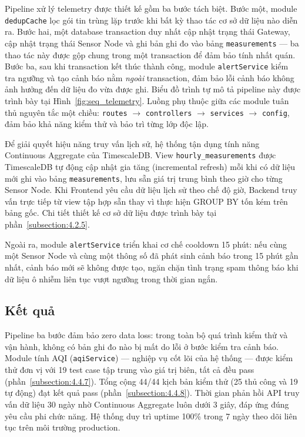 \documentclass[../DoAn.tex]{subfiles}
\begin{document}
Pipeline xử lý telemetry được thiết kế gồm ba bước tách biệt. Bước một, module \texttt{dedupCache} lọc gói tin trùng lặp trước khi bất kỳ thao tác cơ sở dữ liệu nào diễn ra. Bước hai, một database transaction duy nhất cập nhật trạng thái Gateway, cập nhật trạng thái Sensor Node và ghi bản ghi đo vào bảng \texttt{measurements} — ba thao tác này được gộp chung trong một transaction để đảm bảo tính nhất quán. Bước ba, sau khi transaction kết thúc thành công, module \texttt{alertService} kiểm tra ngưỡng và tạo cảnh báo nằm \textit{ngoài} transaction, đảm bảo lỗi cảnh báo không ảnh hưởng đến dữ liệu đo vừa được ghi. Biểu đồ trình tự mô tả pipeline này được trình bày tại Hình~\ref{fig:seq_telemetry}. Luồng phụ thuộc giữa các module tuân thủ nguyên tắc một chiều: \texttt{routes} $\rightarrow$ \texttt{controllers} $\rightarrow$ \texttt{services} $\rightarrow$ \texttt{config}, đảm bảo khả năng kiểm thử và bảo trì từng lớp độc lập.

Để giải quyết hiệu năng truy vấn lịch sử, hệ thống tận dụng tính năng Continuous Aggregate của TimescaleDB. View \texttt{hourly\_measurements} được TimescaleDB tự động cập nhật gia tăng (incremental refresh) mỗi khi có dữ liệu mới ghi vào bảng \texttt{measurements}, lưu sẵn giá trị trung bình theo giờ cho từng Sensor Node. Khi Frontend yêu cầu dữ liệu lịch sử theo chế độ giờ, Backend truy vấn trực tiếp từ view tập hợp sẵn thay vì thực hiện GROUP BY tốn kém trên bảng gốc. Chi tiết thiết kế cơ sở dữ liệu được trình bày tại phần~\ref{subsection:4.2.5}.

Ngoài ra, module \texttt{alertService} triển khai cơ chế cooldown 15 phút: nếu cùng một Sensor Node và cùng một thông số đã phát sinh cảnh báo trong 15 phút gần nhất, cảnh báo mới sẽ không được tạo, ngăn chặn tình trạng spam thông báo khi dữ liệu ô nhiễm liên tục vượt ngưỡng trong thời gian ngắn.

\subsection{Kết quả}
\label{subsection:5.3.3}

Pipeline ba bước đảm bảo zero data loss: trong toàn bộ quá trình kiểm thử và vận hành, không có bản ghi đo nào bị mất do lỗi ở bước kiểm tra cảnh báo. Module tính AQI (\texttt{aqiService}) — nghiệp vụ cốt lõi của hệ thống — được kiểm thử đơn vị với 19 test case tập trung vào giá trị biên, tất cả đều pass (phần~\ref{subsection:4.4.7}). Tổng cộng 44/44 kịch bản kiểm thử (25 thủ công và 19 tự động) đạt kết quả pass (phần~\ref{subsection:4.4.8}). Thời gian phản hồi \gls{API} truy vấn dữ liệu 30 ngày nhờ Continuous Aggregate luôn dưới 3 giây, đáp ứng đúng yêu cầu phi chức năng. Hệ thống duy trì uptime 100\% trong 7 ngày theo dõi liên tục trên môi trường production.
\end{document}
